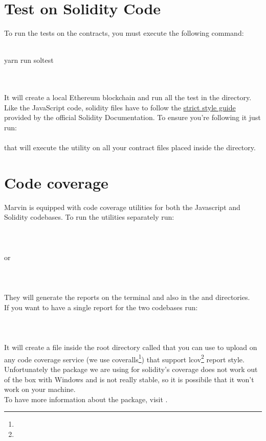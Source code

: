 \documentclass[ManualeSviluppatore]{subfiles}
\begin{document}
\section{Test on Solidity Code}
To run the tests on the contracts, you must execute the following command: \\\\
\begin{ttfamily}\indent yarn run soltest \end{ttfamily} \\\\
It will create a local Ethereum blockchain and run all the test in the  directory. \\
Like the JavaScript code, solidity files have to follow the \href{https://solidity.readthedocs.io/en/v0.3.1/style-guide.html}{strict style guide} provided by the official Solidity Documentation. To ensure you're following it just run: \\
 \\
that will execute the  utility on all your contract files placed inside the  directory.

\section{Code coverage}
Marvin is equipped with code coverage utilities for both the Javascript and Solidity codebases.
To run the utilities separately run: \\\\
\indent {} \\\\
or \\\\
\indent {} \\\\
They will generate the reports on the terminal and also in the  and  directories. \\
If you want to have a single report for the two codebases run: \\\\
\indent {} \\\\
It will create a file inside the root directory called  that you can use to upload on any code coverage service (we use coveralls\footnote{}) that support lcov\footnote{} report style. \\
Unfortunately the package we are using for solidity's coverage does not work out of the box with Windows and is not really stable, so it is possibile that it won't work on your machine. \\
To have more information about the package, visit .
\end{document}
